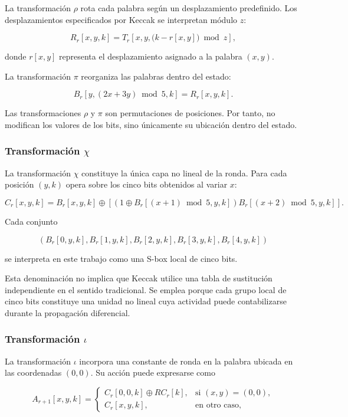 La transformación $\rho$ rota cada palabra según un desplazamiento
predefinido. Los desplazamientos especificados por Keccak se interpretan
módulo $z$:

\[
R_r[x,y,k]
=
T_r
\left[
x,
y,
\bigl(k-r[x,y]\bigr)\bmod z
\right],
\]

donde $r[x,y]$ representa el desplazamiento asignado a la palabra
$(x,y)$.

La transformación $\pi$ reorganiza las palabras dentro del estado:

\[
B_r
\left[
y,
(2x+3y)\bmod 5,
k
\right]
=
R_r[x,y,k].
\]

Las transformaciones $\rho$ y $\pi$ son permutaciones de posiciones. Por
tanto, no modifican los valores de los bits, sino únicamente su ubicación
dentro del estado.


\subsubsection{Transformación \texorpdfstring{$\chi$}{chi}}

La transformación $\chi$ constituye la única capa no lineal de la ronda.
Para cada posición $(y,k)$ opera sobre los cinco bits obtenidos al variar
$x$:

\[
C_r[x,y,k]
=
B_r[x,y,k]
\oplus
\left[
\left(
1 \oplus B_r[(x+1)\bmod 5,y,k]
\right)
B_r[(x+2)\bmod 5,y,k]
\right].
\]

Cada conjunto

\[
\left(
B_r[0,y,k],
B_r[1,y,k],
B_r[2,y,k],
B_r[3,y,k],
B_r[4,y,k]
\right)
\]

se interpreta en este trabajo como una S-box local de cinco bits.

Esta denominación no implica que Keccak utilice una tabla de sustitución
independiente en el sentido tradicional. Se emplea porque cada grupo local
de cinco bits constituye una unidad no lineal cuya actividad puede
contabilizarse durante la propagación diferencial.


\subsubsection{Transformación \texorpdfstring{$\iota$}{iota}}

La transformación $\iota$ incorpora una constante de ronda en la palabra
ubicada en las coordenadas $(0,0)$. Su acción puede expresarse como

\[
A_{r+1}[x,y,k]
=
\begin{cases}
C_r[0,0,k] \oplus RC_r[k],
    & \text{si } (x,y)=(0,0),\\[4pt]
C_r[x,y,k],
    & \text{en otro caso},
\end{cases}
\]

